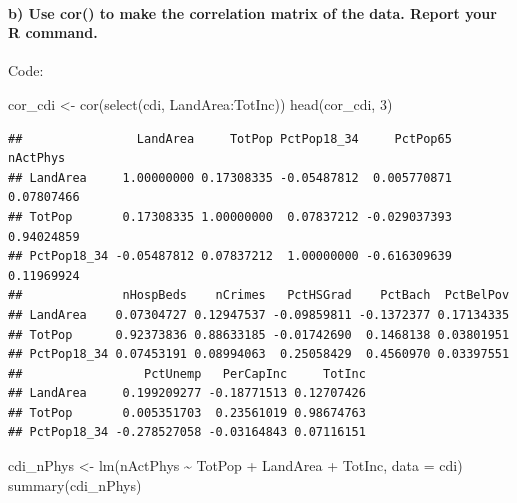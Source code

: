 \documentclass[
]{article}
\newenvironment{Shaded}{\begin{snugshade}}{\end{snugshade}}
\newcommand{\AttributeTok}[1]{\textcolor[rgb]{0.77,0.63,0.00}{#1}}
\newcommand{\DecValTok}[1]{\textcolor[rgb]{0.00,0.00,0.81}{#1}}
\newcommand{\FunctionTok}[1]{\textcolor[rgb]{0.00,0.00,0.00}{#1}}
\newcommand{\NormalTok}[1]{#1}
\newcommand{\OtherTok}[1]{\textcolor[rgb]{0.56,0.35,0.01}{#1}}
\newcommand{\SpecialCharTok}[1]{\textcolor[rgb]{0.00,0.00,0.00}{#1}}
\begin{document}
\hypertarget{b-use-cor-to-make-the-correlation-matrix-of-the-data.-report-your-r-command.}{%
\paragraph{b) Use cor() to make the correlation matrix of the data.
Report your R
command.}\label{b-use-cor-to-make-the-correlation-matrix-of-the-data.-report-your-r-command.}}

\hfill\break
Code:

\begin{Shaded}
\begin{Highlighting}[]
\NormalTok{cor\_cdi }\OtherTok{\textless{}{-}} \FunctionTok{cor}\NormalTok{(}\FunctionTok{select}\NormalTok{(cdi, LandArea}\SpecialCharTok{:}\NormalTok{TotInc))}
\FunctionTok{head}\NormalTok{(cor\_cdi, }\DecValTok{3}\NormalTok{)}
\end{Highlighting}
\end{Shaded}

\begin{verbatim}
##                LandArea     TotPop PctPop18_34     PctPop65   nActPhys
## LandArea     1.00000000 0.17308335 -0.05487812  0.005770871 0.07807466
## TotPop       0.17308335 1.00000000  0.07837212 -0.029037393 0.94024859
## PctPop18_34 -0.05487812 0.07837212  1.00000000 -0.616309639 0.11969924
##              nHospBeds    nCrimes   PctHSGrad    PctBach  PctBelPov
## LandArea    0.07304727 0.12947537 -0.09859811 -0.1372377 0.17134335
## TotPop      0.92373836 0.88633185 -0.01742690  0.1468138 0.03801951
## PctPop18_34 0.07453191 0.08994063  0.25058429  0.4560970 0.03397551
##                 PctUnemp   PerCapInc     TotInc
## LandArea     0.199209277 -0.18771513 0.12707426
## TotPop       0.005351703  0.23561019 0.98674763
## PctPop18_34 -0.278527058 -0.03164843 0.07116151
\end{verbatim}

\begin{Shaded}
\begin{Highlighting}[]
\NormalTok{cdi\_nPhys }\OtherTok{\textless{}{-}} \FunctionTok{lm}\NormalTok{(nActPhys }\SpecialCharTok{\textasciitilde{}}\NormalTok{ TotPop }\SpecialCharTok{+}\NormalTok{ LandArea }\SpecialCharTok{+}\NormalTok{ TotInc, }\AttributeTok{data =}\NormalTok{ cdi)}
\FunctionTok{summary}\NormalTok{(cdi\_nPhys)}
\end{Highlighting}
\end{Shaded}
\end{document}
